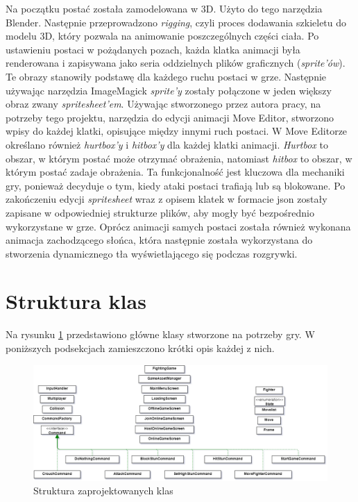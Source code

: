 Na początku postać została zamodelowana w 3D. Użyto do tego narzędzia Blender. Następnie przeprowadzono \emph{rigging}, czyli proces dodawania szkieletu do modelu 3D, który pozwala na animowanie poszczególnych części ciała. Po ustawieniu postaci w pożądanych pozach, każda klatka animacji była renderowana i zapisywana jako seria oddzielnych plików graficznych (\emph{sprite'ów}). Te obrazy stanowiły podstawę dla każdego ruchu postaci w grze. Następnie używając narzędzia ImageMagick \emph{sprite'y} zostały połączone w jeden większy obraz zwany \emph{spritesheet'em}. Używając stworzonego przez autora pracy, na potrzeby tego projektu, narzędzia do edycji animacji Move Editor, stworzono wpisy do każdej klatki, opisujące między innymi ruch postaci. W Move Editorze określano również \emph{hurtbox'y} i \emph{hitbox'y} dla każdej klatki animacji. \emph{Hurtbox} to obszar, w którym postać może otrzymać obrażenia, natomiast \emph{hitbox} to obszar, w którym postać zadaje obrażenia. Ta funkcjonalność jest kluczowa dla mechaniki gry, ponieważ decyduje o tym, kiedy ataki postaci trafiają lub są blokowane. Po zakończeniu edycji \emph{spritesheet} wraz z opisem klatek w formacie json zostały zapisane w odpowiedniej strukturze plików, aby mogły być bezpośrednio wykorzystane w grze. Oprócz animacji samych postaci została również wykonana animacja zachodzącego słońca, która następnie została wykorzystana do stworzenia dynamicznego tła wyświetlającego się podczas rozgrywki.


\section{Struktura klas}
Na rysunku \ref{fig:struktura_klas} przedstawiono główne klasy stworzone na potrzeby gry. W poniższych podsekcjach zamieszczono krótki opis każdej z nich.
\begin{figure}[htb]
	\centering
		\includegraphics[width=1\linewidth]{rys03/struktura_klas}
	\caption{Struktura zaprojektowanych klas}
	\label{fig:struktura_klas}
\end{figure}

